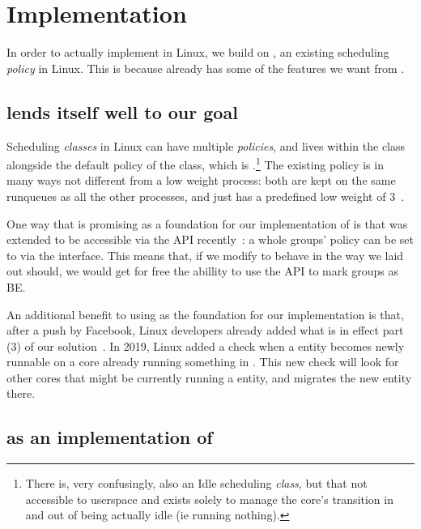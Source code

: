 \section{Implementation}\label{s:implementation}


In order to actually implement \beclass{} in Linux, we build on \schedidle{}, an
existing scheduling \textit{policy} in Linux. This is because \schedidle{}
already has some of the features we want from \beclass{}.

\subsection{\schedidle{} lends itself well to our goal}

Scheduling \textit{classes} in Linux can have multiple \textit{policies}, and
\schedidle{} lives within the \normalclass{} class alongside the default policy
of the \normalclass{} class, which is \schednormal{}.\footnote{There is, very
confusingly, also an Idle scheduling \textit{class}, but that not accessible to
userspace and exists solely to manage the core's transition in and out of being
actually idle (ie running nothing).} The existing \schedidle{} policy is in many
ways not different from a low weight \schednormal{} process: both are kept on
the same runqueues as all the other \schednormal{} processes, and \schedidle{}
just has a predefined low weight of 3~\cite{weight-idleprio}.

One way that \schedidle{} is promising as a foundation for our implementation of
\beclass{} is that \schedidle{} was extended to be accessible via the \cgroups{}
API recently~\cite{lkml-idle-cgroup}: a whole groups' policy can be set to
\schedidle{} via the \cgroups{} interface. This means that, if we modify
\schedidle{} to behave in the way we laid out \beclass{} should, we would get
for free the abillity to use the \cgroups{} API to mark groups as BE.

An additional benefit to using \schedidle{} as the foundation for our
implementation is that, after a push by Facebook, Linux developers already added
what is in effect part (3) of our solution~\cite{fixing-idle-article}. In 2019,
Linux added a check when a \schednormal{} entity becomes newly runnable on a
core already running something in \schednormal{}. This new check will look for
other cores that might be currently running a \schedidle{} entity, and migrates
the new entity there.

\subsection{\schedbe{} as an implementation of \beclass{}}

